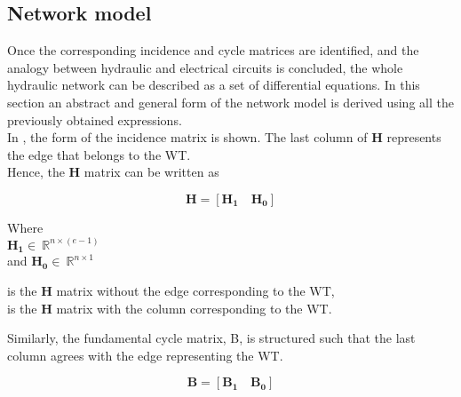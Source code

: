 \subsection{Network model}  
\label{ParameterEstimation}

Once the corresponding incidence and cycle matrices are identified, and the analogy between hydraulic and electrical circuits is concluded, the whole hydraulic network can be described as a set of differential equations. In this section an abstract and general form of the network model is derived using all the previously obtained expressions. 
\\
In , the form of the incidence matrix is shown. The last column of $\bm{H}$ represents the edge that belongs to the WT. 
\\
Hence, the $\bm{H}$ matrix can be written as 

\begin {equation}
\bm{H} = [\bm{H_1} \quad \bm{H_0}]
\label{Hmatrix}
\end{equation}

\begin{minipage}[t]{0.24\textwidth}
Where\\
\hspace*{8mm} $\bm{H_1} \in \: \mathbb{R}^{n \times (e-1)}$  \\
and \hspace*{0.4mm} $\bm{H_0} \in \: \mathbb{R}^{n \times 1} $ 
\end{minipage}
\begin{minipage}[t]{0.70\textwidth}
\vspace*{2mm}
\hspace*{4mm} is the $\bm{H}$ matrix without the edge corresponding to the WT,\\
\hspace*{4mm} is the $\bm{H}$ matrix with the column corresponding to the WT. 
\end{minipage}

Similarly, the fundamental cycle matrix, B, is structured such that the last column agrees with the edge representing the WT.

\begin{equation}
  \bm{B} = [\bm{B_1} \quad \bm{B_0}]
\end{equation} 


